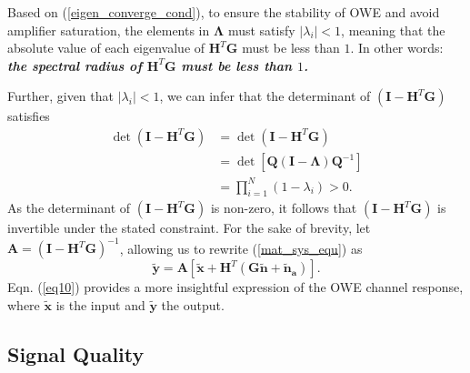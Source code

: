 Based on (\ref{eigen_converge_cond}), to ensure the stability of OWE and avoid amplifier saturation, the elements in $\mathbf{\Lambda}$ must satisfy $|\lambda_i| < 1$, meaning that the absolute value of each eigenvalue of $\mathbf{H}^T\mathbf{G}$ must be less than $1$. In other words: \textbf{\textit{the spectral radius of $\mathbf{H}^T\mathbf{G}$ must be less than $1$.}}
\par
Further, given that $\left| {{\lambda _i}} \right| < 1$, we can infer that the determinant of ${\left( {\mathbf{I} - {\mathbf{H}^T}\mathbf{G}} \right)}$ satisfies
\begin{equation}
\begin{aligned}
\det {\left( {\mathbf{I} - {\mathbf{H}^T}\mathbf{G}} \right)} 
&= \det {\left(\mathbf{I} - {\mathbf{H}^T}\mathbf{G}\right)} \\
&= \det \left[ {\mathbf{Q}(\mathbf{I - \Lambda }){\mathbf{Q}^{ - 1}}} \right] \\
&= \prod\limits_{i = 1}^N {(1 - {\lambda _i})}  > 0 \text{.}
\end{aligned}
\end{equation}
As the determinant of ${\left( {\mathbf{I} - {\mathbf{H}^T}\mathbf{G}} \right)}$ is non-zero, it follows that ${\left( {\mathbf{I} - {\mathbf{H}^T}\mathbf{G}} \right)}$ is invertible under the stated constraint. 
For the sake of brevity, let $\mathbf{A} = {\left( {\mathbf{I} - {\mathbf{H}^T}\mathbf{G}} \right)^{ - 1}}$, allowing us to rewrite (\ref{mat_sys_equ}) as
\begin{equation}
\label{eq10}
\mathbf{\tilde y} = \mathbf{A}\left[ {\mathbf{\tilde x + }{\mathbf{H}^T}\left( {\mathbf{G\tilde n + }{{\mathbf{\tilde n}}_\mathbf{a}}} \right)} \right] \text{.}
\end{equation}
Eqn. (\ref{eq10}) provides a more insightful expression of the OWE channel response, where $\mathbf{\tilde x}$ is the input and $\mathbf{\tilde y}$ the output.

\subsection{Signal Quality}


